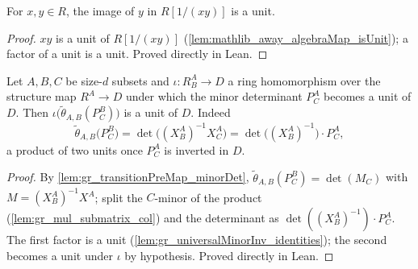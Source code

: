 \begin{lemma}

  \label{lem:gr_isUnit_algebraMap_away_right}
  For \(x, y \in R\), the image of \(y\) in \(R[1/(xy)]\) is a unit.
\end{lemma}
\begin{proof}

\leanok
  \(xy\) is a unit of \(R[1/(xy)]\)
  (\cref{lem:mathlib_away_algebraMap_isUnit}); a factor of a unit is a unit.
  Proved directly in Lean.
\end{proof}

\begin{lemma}

  \label{lem:gr_isUnit_incl_transitionPreMap_cross}
  Let \(A, B, C\) be size-\(d\) subsets and \(\iota : R^A_B \to D\) a ring
  homomorphism over the structure map \(R^A \to D\) under which the minor
  determinant \(P^A_C\) becomes a unit of \(D\). Then
  \(\iota\bigl(\tilde\theta_{A,B}(P^B_C)\bigr)\) is a unit of \(D\). Indeed
  \[
    \tilde\theta_{A,B}\bigl(P^B_C\bigr)
      = \det\bigl((X^A_B)^{-1} X^A_C\bigr)
      = \det\bigl((X^A_B)^{-1}\bigr)\cdot P^A_C ,
  \]
  a product of two units once \(P^A_C\) is inverted in \(D\).
\end{lemma}
\begin{proof}

\leanok
  By \cref{lem:gr_transitionPreMap_minorDet},
  \(\tilde\theta_{A,B}(P^B_C) = \det(M_C)\) with \(M = (X^A_B)^{-1} X^A\); split
  the \(C\)-minor of the product (\cref{lem:gr_mul_submatrix_col}) and the
  determinant as \(\det((X^A_B)^{-1}) \cdot P^A_C\). The first factor is a unit
  (\cref{lem:gr_universalMinorInv_identities}); the second becomes a unit under
  \(\iota\) by hypothesis. Proved directly in Lean.
\end{proof}

